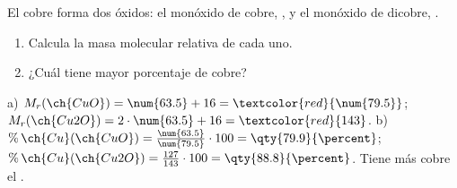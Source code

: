 \begin{exercise}
    El cobre forma dos óxidos: el monóxido de cobre, , y el monóxido de dicobre, .
    \begin{enumerate}[label=\alph*)]
        \item Calcula la masa molecular relativa de cada uno.
        \item ¿Cuál tiene mayor porcentaje de cobre?
    \end{enumerate}
    \begin{solu}
        a) \(M_r(\ch{CuO}) = \num{63.5} + 16 = \textcolor{red}{\num{79.5}}\); \(M_r(\ch{Cu2O}) = 2 \cdot \num{63.5} + 16 = \textcolor{red}{143}\).
        b) \(\%\,\ch{Cu}(\ch{CuO}) = \frac{\num{63.5}}{\num{79.5}} \cdot 100 = \qty{79.9}{\percent}\); \(\%\,\ch{Cu}(\ch{Cu2O}) = \frac{127}{143} \cdot 100 = \qty{88.8}{\percent}\). Tiene más cobre el \textcolor{red}{}.
    \end{solu}
\end{exercise}

